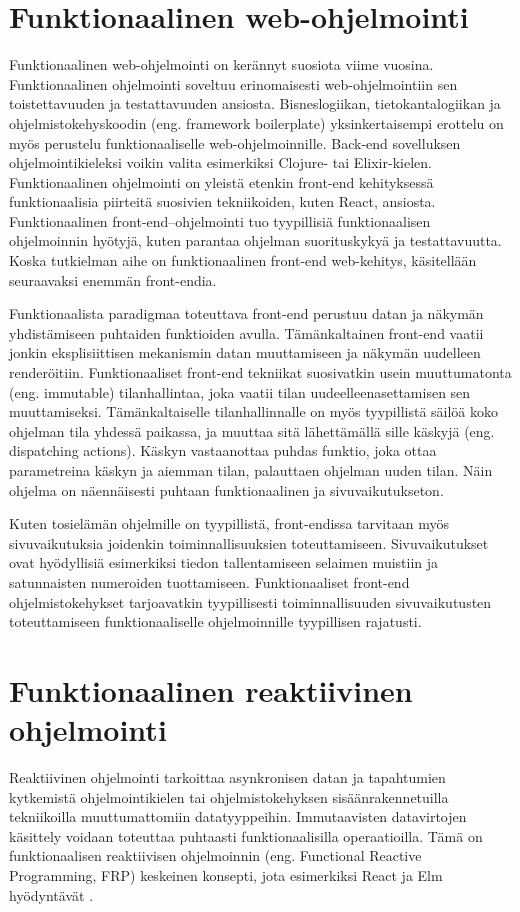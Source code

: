 \section{Funktionaalinen web-ohjelmointi}
Funktionaalinen web-ohjelmointi on kerännyt suosiota viime vuosina. Funktionaalinen ohjelmointi soveltuu erinomaisesti
web-ohjelmointiin sen toistettavuuden ja testattavuuden ansiosta. Bisneslogiikan, tietokantalogiikan ja
ohjelmistokehyskoodin (eng. framework boilerplate) yksinkertaisempi erottelu on myös perustelu funktionaaliselle
web-ohjelmoinnille. Back-end sovelluksen ohjelmointikieleksi voikin valita esimerkiksi Clojure- tai Elixir-kielen.
\cite{functionalwebdev} Funktionaalinen ohjelmointi on yleistä etenkin front-end kehityksessä funktionaalisia piirteitä
suosivien tekniikoiden, kuten React, ansiosta. Funktionaalinen front-end–ohjelmointi tuo tyypillisiä funktionaalisen
ohjelmoinnin hyötyjä, kuten parantaa ohjelman suorituskykyä ja testattavuutta. \cite{functionalreact} Koska tutkielman
aihe on funktionaalinen front-end web-kehitys, käsitellään seuraavaksi enemmän front-endia.

Funktionaalista paradigmaa toteuttava front-end perustuu datan ja näkymän yhdistämiseen puhtaiden funktioiden avulla.
Tämänkaltainen front-end vaatii jonkin eksplisiittisen mekanismin datan muuttamiseen ja näkymän uudelleen renderöitiin.
Funktionaaliset front-end tekniikat suosivatkin usein muuttumatonta (eng. immutable) tilanhallintaa, joka vaatii tilan
uudeelleenasettamisen sen muuttamiseksi. Tämänkaltaiselle tilanhallinnalle on myös tyypillistä säilöä koko ohjelman tila
yhdessä paikassa, ja muuttaa sitä lähettämällä sille käskyjä (eng. dispatching actions). Käskyn vastaanottaa puhdas
funktio, joka ottaa parametreina käskyn ja aiemman tilan, palauttaen ohjelman uuden tilan. Näin ohjelma on näennäisesti
puhtaan funktionaalinen ja sivuvaikutukseton. \cite{functionalreact}

Kuten tosielämän ohjelmille on tyypillistä, front-endissa tarvitaan myös sivuvaikutuksia joidenkin toiminnallisuuksien
toteuttamiseen. Sivuvaikutukset ovat hyödyllisiä esimerkiksi tiedon tallentamiseen selaimen muistiin ja satunnaisten
numeroiden tuottamiseen. Funktionaaliset front-end ohjelmistokehykset tarjoavatkin tyypillisesti toiminnallisuuden
sivuvaikutusten toteuttamiseen funktionaaliselle ohjelmoinnille tyypillisen rajatusti. \cite{elmlang}\cite{reactjs}

\section{Funktionaalinen reaktiivinen ohjelmointi}
Reaktiivinen ohjelmointi tarkoittaa asynkronisen datan ja tapahtumien kytkemistä ohjelmointikielen tai
ohjelmistokehyksen sisäänrakennetuilla tekniikoilla muuttumattomiin datatyyppeihin. Immutaavisten datavirtojen käsittely
voidaan toteuttaa puhtaasti funktionaalisilla operaatioilla. Tämä on funktionaalisen reaktiivisen ohjelmoinnin (eng. 
Functional Reactive Programming, FRP) keskeinen konsepti, jota esimerkiksi React ja Elm hyödyntävät 
\cite{elmlang}\cite{reactjs}. \cite{fpmattered}

